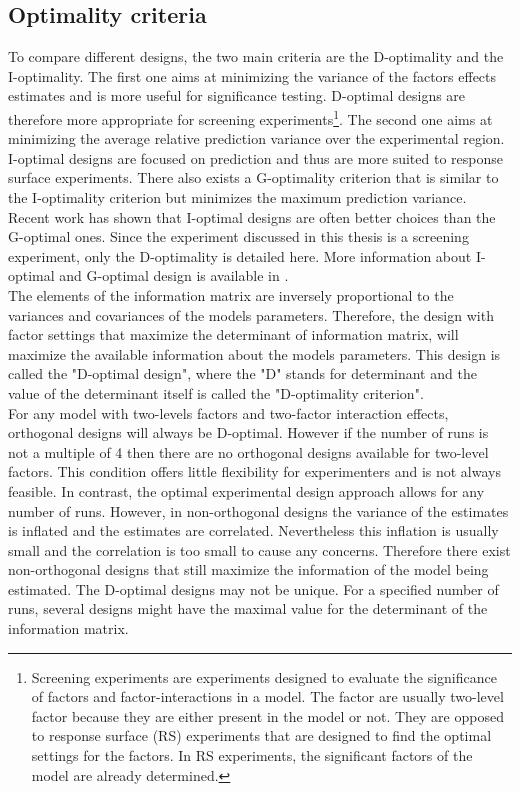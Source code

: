 \subsection{Optimality criteria}
To compare different designs, the two main criteria are the D-optimality and the I-optimality. 
The first one aims at minimizing the variance of the factors effects estimates and is more useful for significance testing. 
D-optimal designs are therefore more appropriate for screening experiments\footnote{Screening experiments are experiments designed to evaluate the significance of factors and factor-interactions in a model. The factor are usually two-level factor because they are either present in the model or not. They are opposed to response surface (RS) experiments that are designed to find the optimal settings for the factors. In RS experiments, the significant factors of the model are already determined.}. 
The second one aims at minimizing the average relative prediction variance over the experimental region. 
I-optimal designs are focused on prediction and thus are more suited to response surface experiments.
There also exists a G-optimality criterion that is similar to the I-optimality criterion but minimizes the maximum prediction 
variance. 
Recent work \parencite{rodriguez_generating_2010} has shown that I-optimal designs are often better choices than the G-optimal 
ones. 
Since the experiment discussed in this thesis is a screening experiment, only the D-optimality is detailed here. 
More information about I-optimal and G-optimal design is available in \textcite{goos_optimal_2011,atkinson2014optimal}.\\

The elements of the information matrix are inversely proportional to the variances and covariances of the models parameters.
Therefore, the design with factor settings that maximize the determinant of information matrix, 
will maximize the available information about the models parameters. 
This design is called the "D-optimal design", 
where the "D" stands for determinant and the value of the determinant itself is called the "D-optimality criterion".\\

For any model with two-levels factors and two-factor interaction effects, orthogonal designs will always be D-optimal. 
However if the number of runs is not a multiple of 4 then there are no orthogonal designs available for two-level factors. 
This condition offers little flexibility for experimenters and is not always feasible. 
In contrast, the optimal experimental design approach allows for any number of runs. 
However, in non-orthogonal designs the variance of the estimates is inflated and the estimates are correlated. 
Nevertheless this inflation is usually small and the correlation is too small to cause any concerns.
Therefore there exist non-orthogonal designs that still maximize the information of the model being estimated.
The D-optimal designs may not be unique. For a specified number of runs,
 several designs might have the maximal value for the determinant of the information matrix.\\


